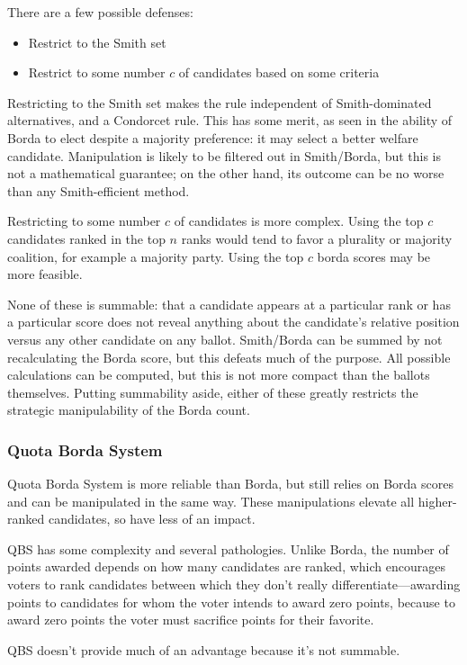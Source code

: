 There are a few possible defenses:

\begin{itemize}
    \item Restrict to the Smith set

    \item Restrict to some number $c$ of candidates based on some criteria
\end{itemize}

Restricting to the Smith set makes the rule independent of Smith-dominated alternatives, and a Condorcet rule.  This has some merit, as seen in the ability of Borda to elect despite a majority preference:  it may select a better welfare candidate.  Manipulation is likely to be filtered out in Smith/Borda, but this is not a mathematical guarantee; on the other hand, its outcome can be no worse than any Smith-efficient method.

Restricting to some number $c$ of candidates is more complex.  Using the top $c$ candidates ranked in the top $n$ ranks would tend to favor a plurality or majority coalition, for example a majority party.  Using the top $c$ borda scores may be more feasible.

None of these is summable:  that a candidate appears at a particular rank or has a particular score does not reveal anything about the candidate's relative position versus any other candidate on any ballot.  Smith/Borda can be summed by not recalculating the Borda score, but this defeats much of the purpose.  All possible calculations can be computed, but this is not more compact than the ballots themselves.  Putting summability aside, either of these greatly restricts the strategic manipulability of the Borda count.

\subsubsection{Quota Borda System}

Quota Borda System is more reliable than Borda, but still relies on Borda scores and can be manipulated in the same way.  These manipulations elevate all higher-ranked candidates, so have less of an impact.

QBS has some complexity and several pathologies.  Unlike Borda, the number of points awarded depends on how many candidates are ranked, which encourages voters to rank candidates between which they don't really differentiate—awarding points to candidates for whom the voter intends to award zero points, because to award zero points the voter must sacrifice points for their favorite.

QBS doesn't provide much of an advantage because it's not summable.